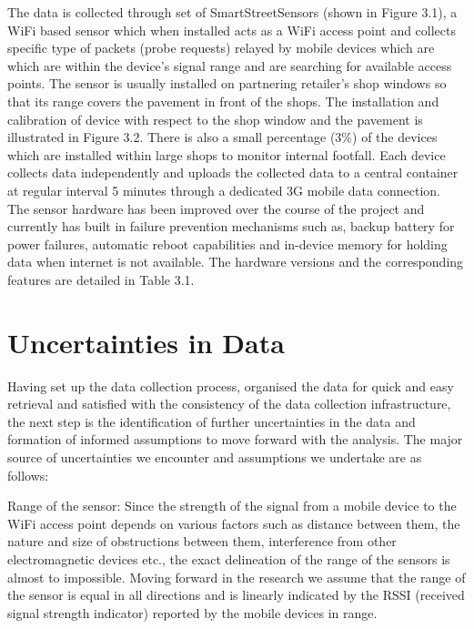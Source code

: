 The data is collected through set of SmartStreetSensors (shown in Figure 3.1), a WiFi based sensor which when installed acts as a WiFi access point and collects specific type of packets (probe requests) relayed by mobile devices which are which are within the device’s signal range and are searching for available access points.
The sensor is usually installed on partnering retailer's shop windows so that its range covers the pavement in front of the shops.
The installation and calibration of device with respect to the shop window and the pavement is illustrated in Figure 3.2.
There is also a small percentage (3\%) of the devices which are installed within large shops to monitor internal footfall.
Each device collects data independently and uploads the collected data to a central container at regular interval 5 minutes through a dedicated 3G mobile data connection.
The sensor hardware has been improved over the course of the project and currently has built in failure prevention mechanisms such as, backup battery for power failures, automatic reboot capabilities and in-device memory for holding data when internet is not available.
The hardware versions and the corresponding features are detailed in Table 3.1.

\section{Uncertainties in Data}

Having set up the data collection process, organised the data for quick and easy retrieval and satisfied with the consistency of the data collection infrastructure, the next step is the identification of further uncertainties in the data and formation of informed assumptions to move forward with the analysis.
The major source of uncertainties we encounter and assumptions we undertake are as follows:

Range of the sensor: Since the strength of the signal from a mobile device to the WiFi access point depends on various factors such as distance between them, the nature and size of obstructions between them, interference from other electromagnetic devices etc., the exact delineation of the range of the sensors is almost to impossible.
Moving forward in the research we assume that the range of the sensor is equal in all directions and is linearly indicated by the RSSI (received signal strength indicator) reported by the mobile devices in range.

